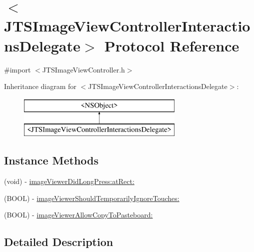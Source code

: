 \hypertarget{protocol_j_t_s_image_view_controller_interactions_delegate-p}{}\section{$<$J\+T\+S\+Image\+View\+Controller\+Interactions\+Delegate$>$ Protocol Reference}
\label{protocol_j_t_s_image_view_controller_interactions_delegate-p}


{\ttfamily \#import $<$J\+T\+S\+Image\+View\+Controller.\+h$>$}

Inheritance diagram for $<$J\+T\+S\+Image\+View\+Controller\+Interactions\+Delegate$>$\+:\begin{figure}[H]
\begin{center}
\leavevmode
\includegraphics[height=2.000000cm]{protocol_j_t_s_image_view_controller_interactions_delegate-p}
\end{center}
\end{figure}
\subsection*{Instance Methods}
\begin{DoxyCompactItemize}
\item 
(void) -\/ \hyperlink{protocol_j_t_s_image_view_controller_interactions_delegate-p_abfddcdb170a5c9eb08e8259a8ba13321}{image\+Viewer\+Did\+Long\+Press\+:at\+Rect\+:}
\item 
(B\+O\+O\+L) -\/ \hyperlink{protocol_j_t_s_image_view_controller_interactions_delegate-p_a8b44d25008bf2e0977495ed35abec8ee}{image\+Viewer\+Should\+Temporarily\+Ignore\+Touches\+:}
\item 
(B\+O\+O\+L) -\/ \hyperlink{protocol_j_t_s_image_view_controller_interactions_delegate-p_a636026b880b115bdc9ca237ca1e35311}{image\+Viewer\+Allow\+Copy\+To\+Pasteboard\+:}
\end{DoxyCompactItemize}


\subsection{Detailed Description}



